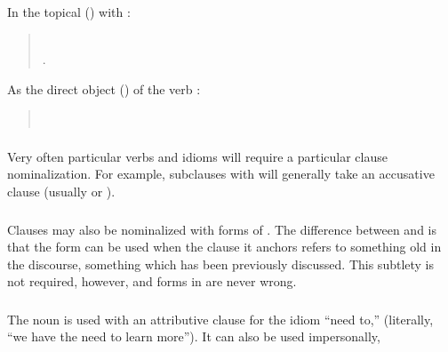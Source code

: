 \noindent In the topical () with :
\begin{quotation}
\noindent{}\\
\indent{}.
\end{quotation}

\noindent As the direct object () of the verb :
\begin{quotation}
\noindent{}\\
\indent{}
\end{quotation}

\subsubsection{} Very often particular verbs and idioms will require a
particular clause nominalization.  For example, subclauses with
  will generally take an accusative clause (usually
 or ).

\subsubsection{} Clauses may also be nominalized with forms of
.  The difference between  and  is that the
 form can be used when the clause it anchors refers to
something old in the discourse, something which has been previously
discussed.  This subtlety is not required, however, and forms in
 are never wrong. 

\subsubsection{} The noun   is used with an
attributive clause for the idiom ``need to,''   (literally, ``we have the need
to learn more''). 
It can also be used impersonally,  


